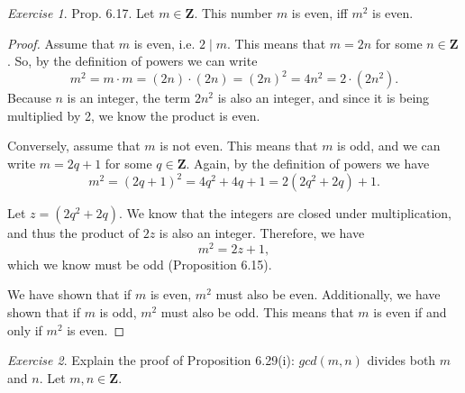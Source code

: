 \documentclass[12pt,oneside]{amsart}
\theoremstyle{remark}
\newtheorem{exer}{Exercise}
\newcommand{\bfZ}{\mathbf{Z}}
\begin{document}
%
%
%
%
\newpage
\begin{exer}
Prop. 6.17. Let $m \in \bfZ$. This number $m$ is even, iff $m^2$ is even.
\end{exer}

%
\begin{proof}
Assume that $m$ is even, i.e. $2 \mid m$. This means that $m = 2n$ for some $n \in \bfZ$. So, by the definition of powers we can write \[ m^2 = m \cdot m = (2n) \cdot (2n) = (2n)^2 = 4n^2 = 2 \cdot (2n^2). \] Because $n$ is an integer, the term $2n^2$ is also an integer, and since it is being multiplied by 2, we know the product is even.

Conversely, assume that $m$ is not even. This means that $m$ is odd, and we can write $m = 2q + 1$ for some $q \in \bfZ$. Again, by the definition of powers we have \[ m^2 = (2q + 1)^2 = 4q^2 + 4q + 1 = 2(2q^2 + 2q) + 1. \]

Let $z = (2q^2 + 2q)$. We know that the integers are closed under multiplication, and thus the product of $2z$ is also an integer. Therefore, we have \[ m^2 = 2z +1, \] which we know must be odd (Proposition 6.15).

We have shown that if $m$ is even, $m^2$ must also be even. Additionally, we have shown that if $m$ is odd, $m^2$ must also be odd. This means that $m$ is even if and only if $m^2$ is even.
\end{proof}

%
%
%
%
\newpage
\begin{exer}
Explain the proof of Proposition 6.29(i): $gcd(m, n)$ divides both $m$ and $n$. Let $m,n \in \bfZ$. %
\end{exer}
\end{document}
